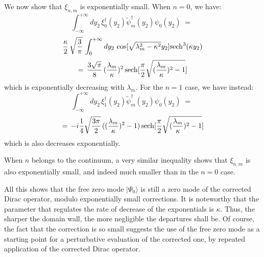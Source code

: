 \documentclass[a4paper,12pt]{article}
\begin{document}
We now show  that $\xi_{n,m}$ is exponentially small. When $n=0$,
we have:
$$
\int_{-\infty}^{+\infty}dy_2\, \xi^\dagger_0(y_2) {\tilde \psi}^\dagger_m (y_2) \psi_0(y_2) \;=\; 
$$
$$
\frac{\kappa}{2} \, \sqrt{\frac{3}{\pi}}  \, 
\int_0^{+\infty} dy_2 \,\cos [\sqrt{\lambda^2_m - \kappa^2} y_2] {\rm sech}^3( \kappa y_2)
$$
\begin{equation}
=\,\frac{3 \sqrt{\pi}}{8} \, (\frac{\lambda_m}{\kappa})^2 \, 
{\rm sech}[\frac{\pi}{2} \sqrt{(\frac{\lambda_m}{\kappa})^2 -1}]  
\end{equation}
which is exponentially decreasing with $\lambda_m$.
For the $n=1$ case, we have instead:
$$
\int_{-\infty}^{+\infty}dy_2\, \xi^\dagger_1(y_2) {\tilde \psi}^\dagger_m (y_2) \psi_0(y_2) \;=\; 
$$
\begin{equation}
=\,- i \frac{1}{4} \sqrt{\frac{3\pi}{2}} \,  ((\frac{\lambda_m}{\kappa})^2 -1) \,
{\rm sech}[\frac{\pi}{2} \sqrt{(\frac{\lambda_m}{\kappa})^2 -1}]  
\end{equation}
which is also decreases exponentially.

When $n$ belongs to the continuum, a very similar inequality 
shows that $\xi_{n,m}$ is also exponentially small, and indeed much 
smaller than in the $n=0$ case.

All this shows that the free zero mode $|\Psi_0\rangle$ is still a zero mode of
the corrected Dirac operator, modulo exponentially small corrections.
It is noteworthy that the parameter that regulates the rate of decrease
of the exponentials is $\kappa$. Thus, the sharper the domain wall, the
more negligible the departures shall be. Of course, the fact that
the correction is so small suggests the use of the free zero mode as
a starting point for a perturbative evaluation of the corrected one,
by repeated application of the corrected Dirac operator.
\end{document}

